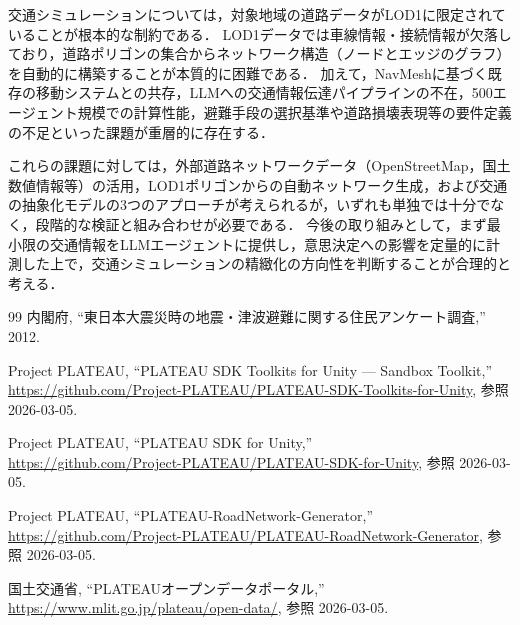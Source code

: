 \documentclass[a4paper,11pt]{jsarticle}
\begin{document}
交通シミュレーションについては，対象地域の道路データがLOD1に限定されていることが根本的な制約である．
LOD1データでは車線情報・接続情報が欠落しており，道路ポリゴンの集合からネットワーク構造（ノードとエッジのグラフ）を自動的に構築することが本質的に困難である．
加えて，NavMeshに基づく既存の移動システムとの共存，LLMへの交通情報伝達パイプラインの不在，500エージェント規模での計算性能，避難手段の選択基準や道路損壊表現等の要件定義の不足といった課題が重層的に存在する．

これらの課題に対しては，外部道路ネットワークデータ（OpenStreetMap，国土数値情報等）の活用，LOD1ポリゴンからの自動ネットワーク生成，および交通の抽象化モデルの3つのアプローチが考えられるが，いずれも単独では十分でなく，段階的な検証と組み合わせが必要である．
今後の取り組みとして，まず最小限の交通情報をLLMエージェントに提供し，意思決定への影響を定量的に計測した上で，交通シミュレーションの精緻化の方向性を判断することが合理的と考える．

\begin{thebibliography}{99}
内閣府, ``東日本大震災時の地震・津波避難に関する住民アンケート調査,'' 2012.

Project PLATEAU, ``PLATEAU SDK Toolkits for Unity --- Sandbox Toolkit,'' \\
\url{https://github.com/Project-PLATEAU/PLATEAU-SDK-Toolkits-for-Unity}, 参照 2026-03-05.

Project PLATEAU, ``PLATEAU SDK for Unity,'' \\
\url{https://github.com/Project-PLATEAU/PLATEAU-SDK-for-Unity}, 参照 2026-03-05.

Project PLATEAU, ``PLATEAU-RoadNetwork-Generator,'' \\
\url{https://github.com/Project-PLATEAU/PLATEAU-RoadNetwork-Generator}, 参照 2026-03-05.

国土交通省, ``PLATEAUオープンデータポータル,'' \\
\url{https://www.mlit.go.jp/plateau/open-data/}, 参照 2026-03-05.
\end{thebibliography}
\end{document}
